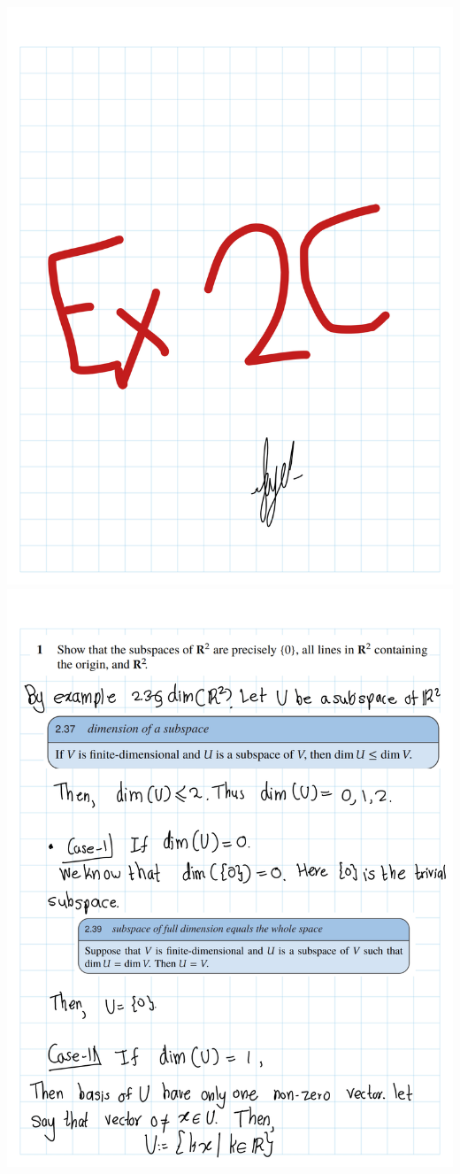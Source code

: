 \documentclass[
]{book}
\theoremstyle{definition}
\theoremstyle{definition}
\theoremstyle{definition}
\theoremstyle{definition}
\theoremstyle{remark}
\begin{document}
\includegraphics{fig/Ex 2B and 2C/Ex 2c (2).png}
\includegraphics{fig/Ex 2B and 2C/Ex 2c (3).png}
\end{document}
